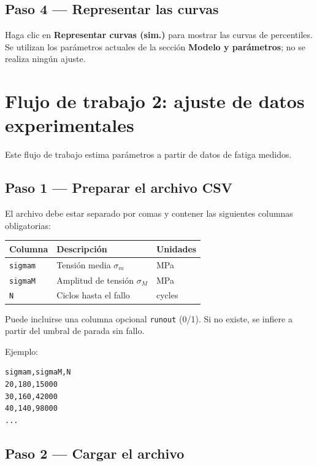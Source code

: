 \documentclass[11pt,a4paper]{article}
\newcommand{\sm}{\ensuremath{\sigma_m}}
\newcommand{\sM}{\ensuremath{\sigma_M}}
\begin{document}
\subsection{Paso 4 --- Representar las curvas}

Haga clic en \textbf{\textcolor{accent}{Representar curvas (sim.)}} para mostrar las curvas de percentiles. Se utilizan los parámetros actuales de la sección \textbf{Modelo y parámetros}; no se realiza ningún ajuste.

\section{Flujo de trabajo 2: ajuste de datos experimentales}

Este flujo de trabajo estima parámetros a partir de datos de fatiga medidos.

\subsection{Paso 1 --- Preparar el archivo CSV}

El archivo debe estar separado por comas y contener las siguientes columnas obligatorias:

\begin{center}
\begin{tabular}{lll}
\toprule
\textbf{Columna} & \textbf{Descripción} & \textbf{Unidades} \\
\midrule
\texttt{sigmam} & Tensión media $\sm$ & MPa \\
\texttt{sigmaM} & Amplitud de tensión $\sM$ & MPa \\
\texttt{N} & Ciclos hasta el fallo & cycles \\
\bottomrule
\end{tabular}
\end{center}

Puede incluirse una columna opcional \texttt{runout} (0/1). Si no existe, se infiere a partir del umbral de parada sin fallo.

Ejemplo:
\begin{lstlisting}
sigmam,sigmaM,N
20,180,15000
30,160,42000
40,140,98000
...
\end{lstlisting}

\subsection{Paso 2 --- Cargar el archivo}
\end{document}
